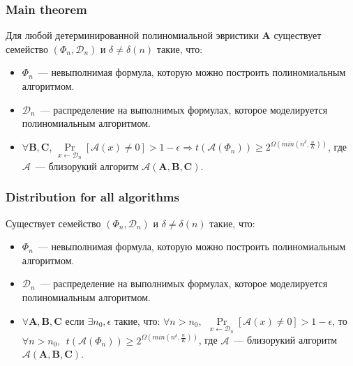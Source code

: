 \begin{frame}
	\frametitle{Main theorem}
	\pause
	\begin{theorem}
        Для любой детерминированной полиномиальной эвристики $\mathbf{A}$
        существует семейство $(\Phi_n, \mathcal{D}_n)$ и $\delta \ne
        \delta(n)$ такие, что:
        \pause
		\begin{itemize}
            \item $\Phi_n$~--- невыполнимая формула, которую можно
		        построить полиномиальным алгоритмом.
            \pause
            \item $\mathcal{D}_n$~--- распределение на выполнимых
		        формулах, которое моделируется полиномиальным алгоритмом.
            \pause
			\item $\forall \mathbf{B}, \mathbf{C}$,
				$\Pr\limits_{x \gets \mathcal{D}_n}[\mathcal{A}(x)
                \ne 0] > 1 - \epsilon \Rightarrow
                t(\mathcal{A}(\Phi_n)) \ge 2^{\Omega(min(n^\delta,
                \frac{n}{K}))}$, где $\mathcal{A}$~--- близорукий
			    алгоритм $\mathcal{A}(\mathbf{A}, \mathbf{B},\mathbf{C})$.
		\end{itemize}
	\end{theorem}
\end{frame}

\begin{frame}
    \frametitle{Distribution for all algorithms}

    \begin{theorem}
        Существует семейство $(\Phi_n, \mathcal{D}_n)$ и $\delta \ne
        \delta(n)$ такие, что:
        \pause
        \begin{itemize}
	        \item $\Phi_n$~--- невыполнимая формула, которую можно
		        построить полиномиальным алгоритмом.
            \pause
            \item $\mathcal{D}_n$~--- распределение на выполнимых
		        формулах, которое моделируется полиномиальным алгоритмом.
            \pause
            \item $\forall \mathbf{A}, \mathbf{B}, \mathbf{C}$ 
		        если $\exists n_0, \epsilon$ такие, что:
				$\forall n > n_0, ~~ \Pr\limits_{x \gets \mathcal{D}_n}[\mathcal{A}(x)
                \ne 0] > 1 - \epsilon$, то
                $\forall n > n_0, ~~ t(\mathcal{A}(\Phi_n)) \ge 2^{\Omega(min(n^\delta,
                \frac{n}{K}))}$, где $\mathcal{A}$~--- близорукий
			    алгоритм $\mathcal{A}(\mathbf{A}, \mathbf{B},\mathbf{C})$.
        \end{itemize}
    \end{theorem}
\end{frame}

